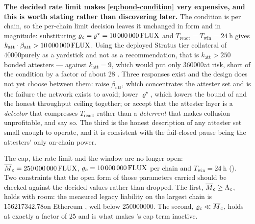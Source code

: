 \medskip
\noindent\textbf{The decided rate limit makes \eqref{eq:bond-condition} very expensive, and this is
worth stating rather than discovering later.} The condition is per chain, so the per-chain limit
decision leaves it unchanged in form and in magnitude: substituting
$\varrho_c = \varrho^\star = \num{10000000}\,\mathrm{FLUX}$ and
$T_{\mathrm{react}} = T_{\mathrm{win}} = \SI{24}{\hour}$ gives
$k_{\mathrm{att}} \cdot \beta_{\mathrm{att}} > \num{10000000}\,\mathrm{FLUX}$. Using the deployed Stratus tier
collateral of \num{40000}\flux purely as a yardstick and not as a recommendation, that is
$k_{\mathrm{att}} > 250$ bonded attesters --- against $k_{\mathrm{att}} = 9$, which would put only
\num{360000}\flux at risk, short of the condition by a factor of about 28 \srcinferred. Three
responses exist and the design does not yet choose between them: raise $\beta_{\mathrm{att}}$, which
concentrates the attester set and is the failure the network exists to avoid; lower $\varrho^\star$,
which lowers the bound of  and the honest throughput ceiling together; or
accept that
the attester layer is a \emph{detector} that compresses $T_{\mathrm{react}}$ rather than a
\emph{deterrent} that makes collusion unprofitable, and say so. The third is the honest description
of any attester set small enough to operate, and it is consistent with the fail-closed pause being
the attesters' only on-chain power. \planned
{}

\noindent The cap, the rate limit and the window are no longer open:
$\overline{M}_{c} = \num{250000000}\,\mathrm{FLUX}$, $\varrho_c = \num{10000000}\,\mathrm{FLUX}$ per chain and
$T_{\mathrm{win}} = \SI{24}{\hour}$ (). Two constraints that the open form of
those parameters carried should be checked against the decided values rather than dropped. The first,
$\overline{M}_{c} \ge \Lambda_c$, holds with room: the measured legacy liability on the largest chain is
\num{156217342.78}\flux on Ethereum , well
below \num{250000000}\flux. The second, $\varrho_c \ll \overline{M}_{c}$, holds at exactly a factor of 25 and
is what makes 's cap term inactive.

